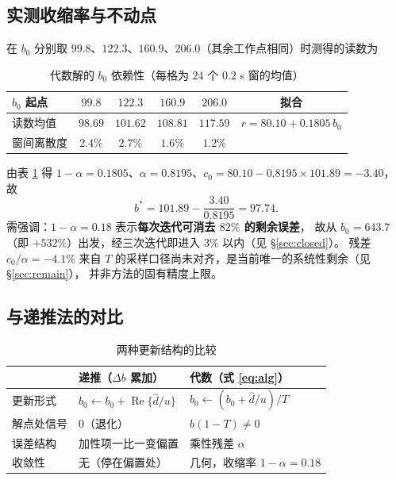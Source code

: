 \documentclass[11pt,a4paper]{ctexart}
\newcommand{\RE}{\operatorname{Re}}
\begin{document}
\subsection{实测收缩率与不动点}

在 $b_0$ 分别取 $99.8$、$122.3$、$160.9$、$206.0$（其余工作点相同）时测得的读数为

\begin{table}[h]
\centering
\caption{代数解的 $b_0$ 依赖性（每格为 $24$ 个 $0.2$ s 窗的均值）}
\label{tab:contract}
\begin{tabular}{lccccc}
\toprule
$b_0$ 起点 & $99.8$ & $122.3$ & $160.9$ & $206.0$ & 拟合 \\
\midrule
读数均值 & $98.69$ & $101.62$ & $108.81$ & $117.59$ & $r=80.10+0.1805\,b_0$ \\
窗间离散度 & $2.4\%$ & $2.7\%$ & $1.6\%$ & $1.2\%$ & \\
\bottomrule
\end{tabular}
\end{table}

由表 \ref{tab:contract} 得 $1-\alpha=0.1805$、$\alpha=0.8195$、$c_0=80.10-0.8195\times101.89=-3.40$，
故
\begin{equation}
b^*=101.89-\frac{3.40}{0.8195}=97.74 .
\end{equation}
需强调：$1-\alpha=0.18$ 表示\textbf{每次迭代可消去 $82\%$ 的剩余误差}，
故从 $b_0=643.7$（即 $+532\%$）出发，经三次迭代即进入 $3\%$ 以内（见 \S\ref{sec:closed}）。
残差 $c_0/\alpha=-4.1\%$ 来自 $T$ 的采样口径尚未对齐，是当前唯一的系统性剩余（见 \S\ref{sec:remain}），
并非方法的固有精度上限。

\subsection{与递推法的对比}

\begin{table}[h]
\centering
\caption{两种更新结构的比较}
\begin{tabular}{lll}
\toprule
& 递推（$\Delta b$ 累加） & 代数（式 \eqref{eq:alg}）\\
\midrule
更新形式 & $b_0\leftarrow b_0+\RE\{\hat d/u\}$ & $b_0\leftarrow (b_0+\hat d/u)/T$ \\
解点处信号 & $0$（退化） & $b(1-T)\neq0$ \\
误差结构 & 加性项一比一变偏置 & 乘性残差 $\alpha$ \\
收敛性 & 无（停在偏置处） & 几何，收缩率 $1-\alpha=0.18$ \\
\bottomrule
\end{tabular}
\end{table}
\end{document}
